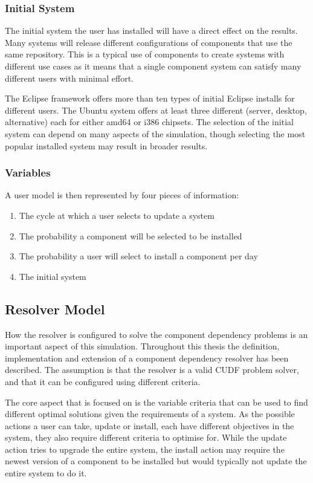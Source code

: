 \subsubsection{Initial System}
The initial system the user has installed will have a direct effect on the results.
Many systems will release different configurations of components that use the same repository.
This is a typical use of components to create systems with different use cases as it means that a single component system can satisfy many different users with minimal effort.

The Eclipse framework offers more than ten types of initial Eclipse installs for different users.
The Ubuntu system offers at least three different (server, desktop, alternative) each for either amd64 or i386 chipsets.
The selection of the initial system can depend on many aspects of the simulation, 
though selecting the most popular installed system may result in broader results. 

\subsubsection{Variables}
A user model is then represented by four pieces of information:
\begin{enumerate}
  \item The cycle at which a user selects to update a system
  \item The probability a component will be selected to be installed
  \item The probability a user will select to install a component per day
  \item The initial system
\end{enumerate}


\subsection{Resolver Model}
How the resolver is configured to solve the component dependency problems is an important aspect of this simulation.
Throughout this thesis the definition, implementation and extension of a component dependency resolver has been described.
The assumption is that the resolver is a valid CUDF problem solver, and that it can be configured using different criteria.

The core aspect that is focused on is the variable criteria that can be used to find different optimal solutions given the requirements of a system.
As the possible actions a user can take, update or install, each have different objectives in the system,
they also require different criteria to optimise for.
While the update action tries to upgrade the entire system, 
the install action may require the newest version of a component to be installed but would typically not update the entire system to do it. 


